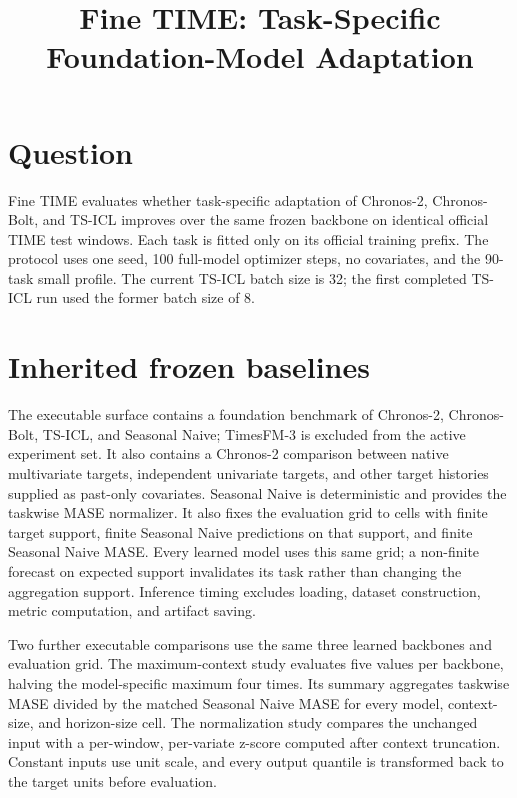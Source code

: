 \documentclass[10pt]{article}
\title{Fine TIME: Task-Specific Foundation-Model Adaptation}
\author{}
\date{}
\begin{document}
\maketitle

\section{Question}

Fine TIME evaluates whether task-specific adaptation of Chronos-2,
Chronos-Bolt, and TS-ICL improves over the same frozen backbone on identical
official TIME test windows. Each task is fitted only on its official training
prefix. The protocol uses one seed, 100 full-model optimizer steps, no
covariates, and the 90-task small profile. The current TS-ICL batch size is 32;
the first completed TS-ICL run used the former batch size of 8.

\section{Inherited frozen baselines}

The executable surface contains a foundation benchmark of Chronos-2,
Chronos-Bolt, TS-ICL, and Seasonal Naive; TimesFM-3 is excluded from the active
experiment set. It also contains a Chronos-2 comparison between native
multivariate targets, independent univariate targets, and other target
histories supplied as past-only covariates. Seasonal Naive is deterministic
and provides the taskwise MASE
normalizer. It also fixes the evaluation grid to cells with finite target
support, finite Seasonal Naive predictions on that support, and finite
Seasonal Naive MASE. Every learned model uses this same grid; a non-finite
forecast on expected support invalidates its task rather than changing the
aggregation support. Inference timing excludes loading, dataset construction,
metric computation, and artifact saving.

Two further executable comparisons use the same three learned backbones and
evaluation grid. The maximum-context study evaluates five values per backbone,
halving the model-specific maximum four times. Its summary aggregates
taskwise MASE divided by the matched Seasonal Naive MASE for every model,
context-size, and horizon-size cell. The normalization study compares the
unchanged input with a per-window, per-variate z-score computed after context
truncation. Constant inputs use unit scale, and every output quantile is
transformed back to the target units before evaluation.
\end{document}

